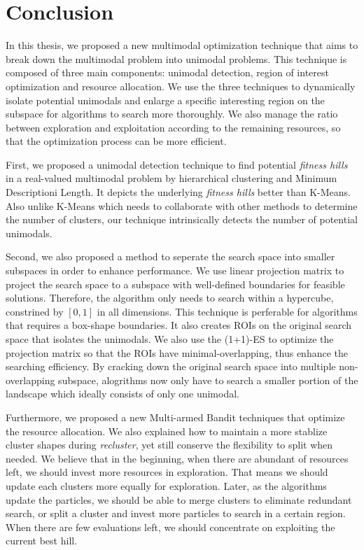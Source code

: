 \chapter{Conclusion}
\label{chapter:conclusion}

In this thesis, we proposed a new multimodal optimization technique that aims to break down the multimodal problem into unimodal problems.
This technique is composed of three main components: unimodal detection, region of interest optimization and resource allocation.
We use the three techniques to dynamically isolate potential unimodals and enlarge a specific interesting region on the subspace for algorithms to search more thoroughly.
We also manage the ratio between exploration and exploitation according to the remaining resources,
so that the optimization process can be more efficient.

First, we proposed a unimodal detection technique to find potential \textit{fitness hills} in a real-valued multimodal problem 
by hierarchical clustering and Minimum Descriptioni Length.
It depicts the underlying \textit{fitness hills} better than K-Means.
Also unlike K-Means which needs to collaborate with other methods to determine the number of clusters,
our technique intrinsically detects the number of potential unimodals.

Second, we also proposed a method to seperate the search space into smaller subspaces in order to enhance performance.
We use linear projection matrix to project the search space to a subspace with well-defined boundaries for feasible solutions.
Therefore, the algorithm only needs to search within a hypercube, constrined by $[0,1]$ in all dimensions.
This technique is perferable for algorithms that requires a box-shape boundaries.
It also creates ROIs on the original search space that isolates the unimodals.
We also use the (1+1)-ES to optimize the projection matrix so that the ROIs have minimal-overlapping, thus enhance the searching efficiency.
By cracking down the original search space into multiple non-overlapping subspace, 
alogrithms now only have to search a smaller portion of the landscape which ideally consists of only one unimodal.

Furthermore, we proposed a new Multi-armed Bandit techniques that optimize the resource allocation.
We also explained how to maintain a more stablize cluster shapes during \textit{recluster}, 
yet still conserve the flexibility to split when needed.
We believe that in the beginning, when there are abundant of resources left, we should invest more resources in exploration.
That means we should update each clusters more equally for exploration.
Later, as the algorithms update the particles, we should be able to merge clusters to eliminate redundant search,
or split a cluster and invest more particles to search in a certain region.
When there are few evaluations left, we should concentrate on exploiting the current best hill.

